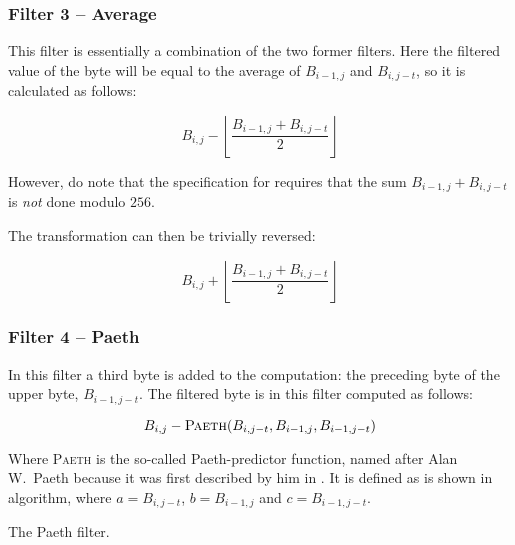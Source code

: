 \subsubsection{Filter 3 -- Average}

This filter is essentially a combination of the two former
filters. Here the filtered value of the byte will be equal to the
average of $B_{i-1,j}$ and $B_{i,j-t}$, so it is calculated as
follows:

\begin{equation*}
  B_{i,j} - \left \lfloor \frac{B_{i-1,j} +
      B_{i,j-t}}{2} \right \rfloor
\end{equation*}

However, do note that the \png specification for requires that the sum
$B_{i-1,j} + B_{i,j-t}$ is \textit{not} done modulo $256$.

The transformation can then be trivially reversed:

\begin{equation*}
  B_{i,j} + \left \lfloor \frac{B_{i-1,j} +
      B_{i,j-t}}{2} \right \rfloor
\end{equation*}

\subsubsection{Filter 4 -- Paeth}

In this filter a third byte is added to the computation: the preceding
byte of the upper byte, $B_{i-1,j-t}$. The filtered byte is in this
filter computed as follows:

\begin{equation*}
  B_{i,j} - \textsc{Paeth}(B_{i,j-t},B_{i-1,j},B_{i-1,j-t})
\end{equation*}

Where \textsc{Paeth} is the so-called Paeth-predictor function, named
after Alan W.~Paeth because it was first described by him in
\cite{arvo1994graphics_gems}. It is defined as is shown in algorithm,
where $a=B_{i,j-t}$, $b=B_{i-1,j}$ and $c=B_{i-1,j-t}$.


\begin{algorithm}[H]
  \caption{The Paeth filter.}
  \label{alg:paeth}
  \begin{algorithmic}[1]
    \State {}
    \State {}
    \Else
    \State {}
    \EndIf
    \EndProcedure
  \end{algorithmic}
\end{algorithm}

